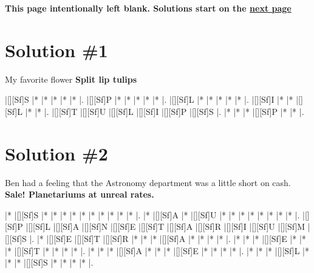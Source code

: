 \documentclass[letterpaper]{article}
\begin{document}
\newpage
\begin{center}
\textbf{This page intentionally left blank. Solutions start on the \hyperlink{solstart}{next page}}
\end{center}

\newpage

\hypertarget{solstart}{}
\section*{Solution \#1}
My favorite flower
\newline\textbf{Split lip tulips}

\vspace*{1em}
\begin{Puzzle}{6}{6}
|[][Sf]S  |*        |*        |*        |*        |*        |. 
|[][Sf]P  |*        |*        |*        |*        |*        |.  
|[][Sf]L  |*        |*        |*        |*        |*        |.
|[][Sf]I  |*        |*        |[][Sf]L  |*        |*        |.  
|[][Sf]T  |[][Sf]U  |[][Sf]L  |[][Sf]I  |[][Sf]P  |[][Sf]S  |.
|*        |*        |*        |[][Sf]P  |*        |*        |.
\end{Puzzle}

\newpage
\section*{Solution \#2}
Ben had a feeling that the Astronomy department was a little short on cash.
\newline\textbf{Sale! Planetariums at unreal rates.}

\vspace*{1em}
\begin{Puzzle}{12}{8}
|*        |[][Sf]S  |*        |*        |*        |*        |*        |*        |*        |*        |*        |*        |.
|*        |[][Sf]A  |*        |[][Sf]U  |*        |*        |*        |*        |*        |*        |*        |*        |.
|[][Sf]P  |[][Sf]L  |[][Sf]A  |[][Sf]N  |[][Sf]E  |[][Sf]T  |[][Sf]A  |[][Sf]R  |[][Sf]I  |[][Sf]U  |[][Sf]M  |[][Sf]S  |.
|*        |[][Sf]E  |[][Sf]T  |[][Sf]R  |*        |*        |*        |[][Sf]A  |*        |*        |*        |*        |.
|*        |*        |*        |[][Sf]E  |*        |*        |*        |[][Sf]T  |*        |*        |*        |*        |.
|*        |*        |*        |[][Sf]A  |*        |*        |*        |[][Sf]E  |*        |*        |*        |*        |.
|*        |*        |*        |[][Sf]L  |*        |*        |*        |[][Sf]S  |*        |*        |*        |*        |.
\end{Puzzle}
\end{document}

